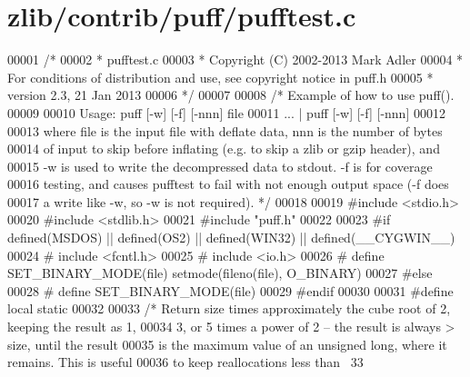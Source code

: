 \hypertarget{zlib_2contrib_2puff_2pufftest_8c_source}{}\section{zlib/contrib/puff/pufftest.c}
\label{zlib_2contrib_2puff_2pufftest_8c_source}

\begin{DoxyCode}
00001 \textcolor{comment}{/*}
00002 \textcolor{comment}{ * pufftest.c}
00003 \textcolor{comment}{ * Copyright (C) 2002-2013 Mark Adler}
00004 \textcolor{comment}{ * For conditions of distribution and use, see copyright notice in puff.h}
00005 \textcolor{comment}{ * version 2.3, 21 Jan 2013}
00006 \textcolor{comment}{ */}
00007 
00008 \textcolor{comment}{/* Example of how to use puff().}
00009 \textcolor{comment}{}
00010 \textcolor{comment}{   Usage: puff [-w] [-f] [-nnn] file}
00011 \textcolor{comment}{          ... | puff [-w] [-f] [-nnn]}
00012 \textcolor{comment}{}
00013 \textcolor{comment}{   where file is the input file with deflate data, nnn is the number of bytes}
00014 \textcolor{comment}{   of input to skip before inflating (e.g. to skip a zlib or gzip header), and}
00015 \textcolor{comment}{   -w is used to write the decompressed data to stdout.  -f is for coverage}
00016 \textcolor{comment}{   testing, and causes pufftest to fail with not enough output space (-f does}
00017 \textcolor{comment}{   a write like -w, so -w is not required). */}
00018 
00019 \textcolor{preprocessor}{#include <stdio.h>}
00020 \textcolor{preprocessor}{#include <stdlib.h>}
00021 \textcolor{preprocessor}{#include "puff.h"}
00022 
00023 \textcolor{preprocessor}{#if defined(MSDOS) || defined(OS2) || defined(WIN32) || defined(\_\_CYGWIN\_\_)}
00024 \textcolor{preprocessor}{#  include <fcntl.h>}
00025 \textcolor{preprocessor}{#  include <io.h>}
00026 \textcolor{preprocessor}{#  define SET\_BINARY\_MODE(file) setmode(fileno(file), O\_BINARY)}
00027 \textcolor{preprocessor}{#else}
00028 \textcolor{preprocessor}{#  define SET\_BINARY\_MODE(file)}
00029 \textcolor{preprocessor}{#endif}
00030 
00031 \textcolor{preprocessor}{#define local static}
00032 
00033 \textcolor{comment}{/* Return size times approximately the cube root of 2, keeping the result as 1,}
00034 \textcolor{comment}{   3, or 5 times a power of 2 -- the result is always > size, until the result}
00035 \textcolor{comment}{   is the maximum value of an unsigned long, where it remains.  This is useful}
00036 \textcolor{comment}{   to keep reallocations less than ~33%
}
\end{DoxyCode}
